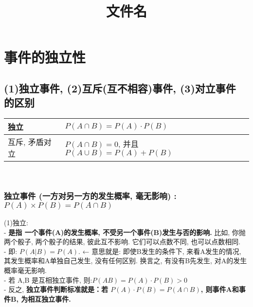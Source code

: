 \documentclass[UTF8]{ctexart}
\title{文件名}
\begin{document}
	\tableofcontents %
	\date{} %
	\maketitle  %
	
		
	

	\section{ 事件的独立性}
	
	
	
	\subsection{(1)独立事件, (2)互斥(互不相容)事件, (3)对立事件 的区别 }	
	
	
	\begin{tabular}{|l|l|}
		\hline
		独立 &   $P(A \cap B)=P(A) \cdot P(B)$ \\	
		\hline
		互斥, 矛盾对立 &  $P(A \cap B)=0$, 并且 $P(A \cup B)=P(A) + P(B)$ \\	
		\hline
	\end{tabular} \\
	
	
	
	
	\subsubsection{独立事件 (一方对另一方的发生概率, 毫无影响) : $P(A)×P(B)=P(A \cap B)$}
	
	(1)独立: \\
	- \textbf{是指 一个事件(A)的发生概率, 不受另一个事件(B)发生与否的影响.} 比如, 你抛两个骰子, 两个骰子的结果, 彼此互不影响. 它们可以点数不同, 也可以点数相同. \\
	- 即: $ P(A|B)=P(A)$.  ← 意思就是: 即使B发生的条件下, 来看A发生的情况, 其发生概率和A单独自己发生, 没有任何区别. 换言之, 有没有B先发生, 对A的发生概率毫无影响.\\
	- 若 A,B 是互相独立事件, 则:$ P(AB)=P(A) \cdot P(B) > 0$ \\
	- 反之, \textbf{独立事件判断标准就是：若 $P(A) \cdot P(B)=P(A \cap B)$, 则事件A和事件B, 为相互独立事件.}  \\
	
\end{document}
